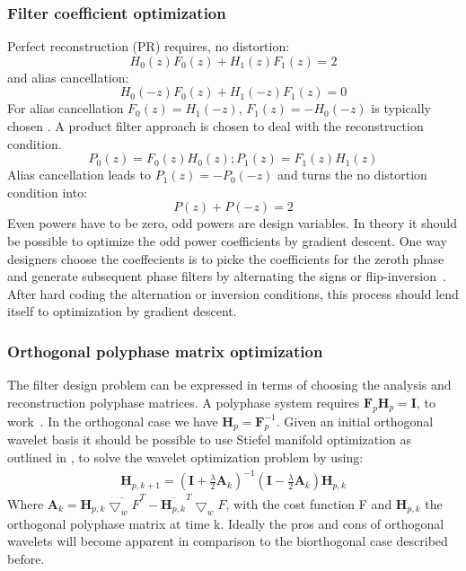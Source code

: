\documentclass{article}
\begin{document}
\subsubsection{Filter coefficient optimization}
Perfect reconstruction (PR) \cite{Selesnick2005}\cite[page 107]{Strang1997} requires, no distortion:
\begin{equation}
H_0(z) F_{0}(z) + H_1(z) F_1(z) = 2
\end{equation}
and alias cancellation:
\begin{equation}
H_0(-z) F_{0}(z) + H_1(-z) F_1(z) = 0
\end{equation}
For alias cancellation $F_0(z) = H_1(-z)$, $F_1(z) = -H_0(-z)$ is typically chosen \cite{Strang1994}. A product filter approach is chosen to deal with the reconstruction condition.
\begin{equation}
P_0(z) = F_0(z)H_0(z); P_1(z) = F_1(z)H_1(z) 
\end{equation}
Alias cancellation leads to $P_1(z) = -P_0(-z)$ and turns the no distortion condition into:
\begin{equation}
P(z) + P(-z) = 2
\end{equation}
Even powers have to be zero, odd powers are design variables\cite[page 107]{Strang1997}. In theory it should be possible to optimize the odd power coefficients by gradient descent. 
One way designers choose the coeffecients is to picke the coefficients for the zeroth phase and generate subsequent phase filters by alternating the signs or flip-inversion~\cite[page 109]{Strang1997}. After hard coding the alternation or inversion conditions, this process should lend itself to optimization by gradient descent.

\subsubsection{Orthogonal polyphase matrix optimization}
The filter design problem can be expressed in terms of choosing the analysis and reconstruction polyphase matrices. A polyphase system requires $\mathbf{F}_p \mathbf{H}_p = \mathbf{I}$, to work~\cite[page 116]{Strang1997}. In the orthogonal case we have $\mathbf{H}_p = \mathbf{F}_p^{-1}$. Given an initial orthogonal wavelet basis it should be possible to use Stiefel manifold optimization as outlined in \cite{Wisdom2016}\cite{wolter-2018-neurips}, to solve the wavelet optimization problem by using:
\begin{align}
\mathbf{H}_{p, k+1} = (\mathbf{I} + \frac{\lambda}{2}\mathbf{A}_k)^{-1}(\mathbf{I} - \frac{\lambda}{2}\mathbf{A}_k)\mathbf{H}_{p, k}
\end{align}
Where $\mathbf{A}_k = \mathbf{H}_{p,k}\overline{\bigtriangledown_{w}F}^T - \overline{\mathbf{H}_{p, k}}^T\bigtriangledown_{w}F$, with the cost function F and $\mathbf{H}_{p,k}$ the orthogonal polyphase matrix at time k. Ideally the pros and cons of orthogonal wavelets will become apparent in comparison to the biorthogonal case described before.
\end{document}

